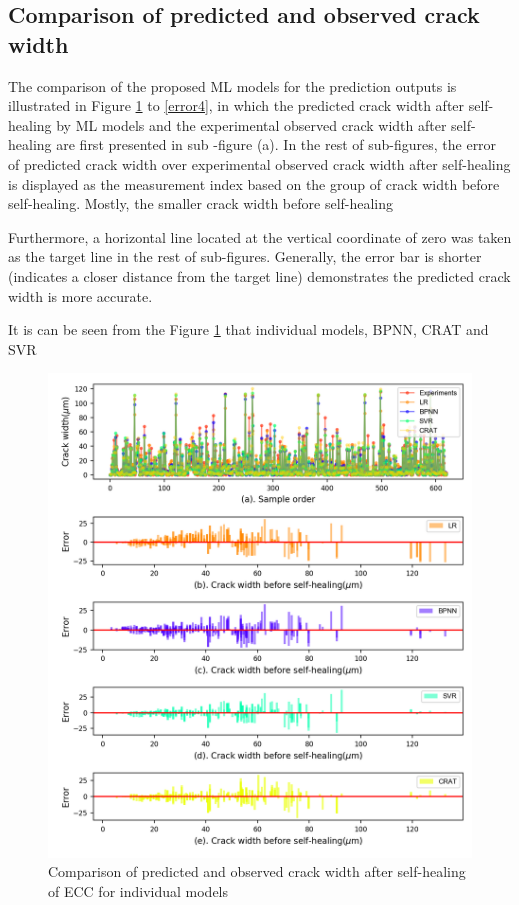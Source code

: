 \documentclass[11pt]{article}
\begin{document}
	\subsection{Comparison of predicted and observed crack width}
	
	The comparison of the proposed ML models for the prediction outputs is illustrated in Figure \ref{error1} to \ref{error4}, in which the predicted crack width after self-healing by ML models and the experimental observed crack width after self-healing are first presented in sub -figure (a). In the rest of sub-figures, the error of predicted crack width over experimental observed crack width after self-healing is displayed as the measurement index based on the group of crack width before self-healing. Mostly, the smaller crack width before self-healing 
	
	
	
	Furthermore, a horizontal line located at the vertical coordinate of zero was taken as the target line in the rest of sub-figures. Generally, the error bar is shorter (indicates a closer distance from the target line) demonstrates the predicted crack width is more accurate. 
	
	It is can be seen from the Figure \ref{error1} that individual models, BPNN, CRAT and SVR 	
	
	\begin{figure}[!h]
		\centering
		\includegraphics[width=\textwidth]{error.png}
		\caption{Comparison of predicted and observed crack width after self-healing of ECC for individual models}
		\label{error1}
	\end{figure}
	
\end{document}

